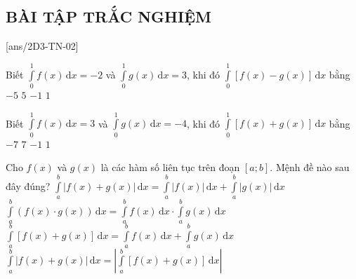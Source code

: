 \subsection{BÀI TẬP TRẮC NGHIỆM}
[ans/2D3-TN-02]

\begin{ex}%
	Biết $\displaystyle \int\limits_{0}^{1}f(x) \mathrm{\,d}x=-2$ và $\displaystyle \int\limits_{0}^{1}g(x)\mathrm{\,d}x=3$, khi đó $\displaystyle \int\limits_{0}^{1}\left[f(x)-g(x)\right]\mathrm{\,d}x$ bằng
	\choice
	{\True $-5$}
	{$5$}
	{$-1$}
	{$1$}
\end{ex}
\begin{ex}%
	Biết $\displaystyle\int\limits_0^1f(x)\mathrm{\,d}x=3$ và $\displaystyle\int\limits_0^1g(x)\mathrm{\,d}x=-4$, khi đó $\displaystyle\int\limits_0^1[f(x)+g(x)]\mathrm{\,d}x$ bằng
	\choice
	{$-7$}
	{$7$}
	{\True $-1$}
	{$1$}
\end{ex}
\begin{ex}%
	Cho $f(x)$ và $g(x)$ là các hàm số liên tục trên đoạn $[a;b]$. Mệnh đề nào sau đây đúng?
	\choice
	{$\displaystyle\int\limits_a^b |f(x)+g(x)|\mathrm{\,d}x=\displaystyle\int\limits_a^b |f(x)|\mathrm{\,d}x+\displaystyle\int\limits_a^b |g(x)|\mathrm{\,d}x$}
	{$\displaystyle\int\limits_a^b (f(x)\cdot g(x))\mathrm{\,d}x=\displaystyle\int\limits_a^b f(x)\mathrm{\,d}x\cdot\displaystyle\int\limits_a^b g(x)\mathrm{\,d}x$}
	{\True $\displaystyle\int\limits_a^b \left[f(x)+g(x)\right]\mathrm{\,d}x=\displaystyle\int\limits_a^b f(x)\mathrm{\,d}x+\displaystyle\int\limits_a^b g(x)\mathrm{\,d}x$}
	{$\displaystyle\int\limits_a^b \left|f(x)+g(x)\right|\mathrm{\,d}x=\left|\displaystyle\int\limits_a^b \left[f(x)+ g(x)\right]\mathrm{\,d}x\right|$}
\end{ex}
